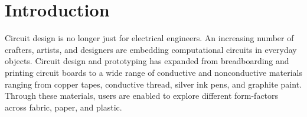 \documentclass{sigchi}
\begin{document}

\section{Introduction}

Circuit design is no longer just for electrical engineers. An increasing number of crafters, artists, and designers are embedding computational circuits in everyday objects.
Circuit design and prototyping has expanded from breadboarding and printing circuit boards to a wide range of conductive and nonconductive materials ranging from copper tapes, conductive thread, silver ink pens, and graphite paint.
Through these materials, users are enabled to explore different form-factors across fabric, paper, and plastic.
\end{document}
